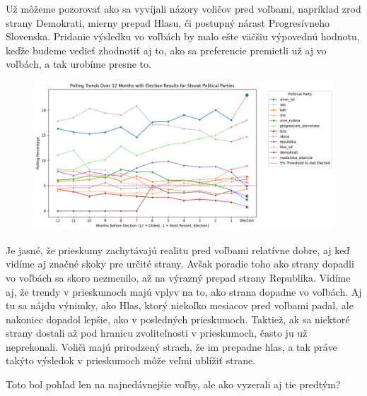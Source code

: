 \documentclass[report.tex]{subfiles}
\begin{document}
Už môžeme pozorovať ako sa vyvíjali názory voličov pred voľbami, napríklad zrod strany Demokrati, mierny prepad Hlasu, či postupný nárast Progresívneho Slovenska. Pridanie výsledku vo voľbách by malo ešte väčšiu výpovednú hodnotu, keďže budeme vedieť zhodnotiť aj to, ako sa preferencie premietli už aj vo voľbách, a tak urobíme presne to.
\begin{figure}[H]
    \centering
    \includegraphics[width=\textwidth]{images_exploratory/Polls_with_result_2023.png}
    \caption{}
\end{figure}

Je jasné, že prieskumy zachytávajú realitu pred voľbami relatívne dobre, aj keď vidíme aj značné skoky pre určité strany. Avšak poradie toho ako strany dopadli vo voľbách sa skoro nezmenilo, až na výrazný prepad strany Republika.
Vidíme aj, že trendy v prieskumoch majú vplyv na to, ako strana dopadne vo voľbách. Aj tu sa nájdu výnimky, ako Hlas, ktorý niekoľko mesiacov pred voľbami padal, ale nakoniec dopadol lepšie, ako v posledných prieskumoch. Taktiež, ak sa niektoré strany dostali až pod hranicu zvoliteľnosti v prieskumoch, často ju už neprekonali. Voliči majú prirodzený strach, že im prepadne hlas, a tak práve takýto výsledok v prieskumoch môže veľmi ublížiť strane.

Toto bol pohľad len na najnedávnejšie voľby, ale ako vyzerali aj tie predtým?
\end{document}
